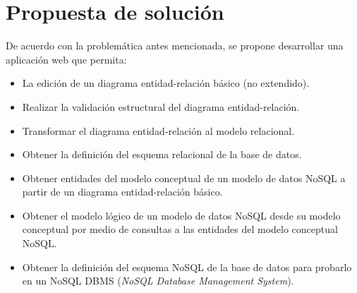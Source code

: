 \section{Propuesta de solución}

De acuerdo con la problemática antes mencionada, se propone desarrollar una aplicación web que permita:

\begin{itemize}
    \item La edición de un diagrama entidad-relación básico (no extendido).
    \item Realizar la validación estructural del diagrama entidad-relación.
    \item Transformar el diagrama entidad-relación al modelo relacional.
    \item Obtener la definición del esquema relacional de la base de datos.
    \item Obtener entidades del modelo conceptual de un modelo de datos NoSQL a partir de un diagrama entidad-relación básico.
    \item Obtener el modelo lógico de un modelo de datos NoSQL desde su modelo conceptual por medio de consultas a las entidades del modelo conceptual NoSQL.
    \item Obtener la definición del esquema NoSQL de la base de datos para probarlo en un NoSQL DBMS (\textit{NoSQL Database Management System}).
\end{itemize}